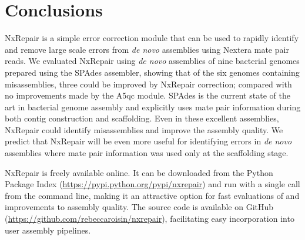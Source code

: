 \section{Conclusions}
NxRepair is a simple error correction module that can be used to rapidly identify and remove large scale errors from \textit{de novo} assemblies using Nextera mate pair reads. We evaluated NxRepair using \textit{de novo} assemblies of nine bacterial genomes prepared using the SPAdes assembler, showing that of the six genomes containing misassemblies, three could be improved by NxRepair correction; compared with no improvements made by the A5qc module. SPAdes is the current state of the art in bacterial genome assembly and explicitly uses mate pair information during both contig construction and scaffolding. Even in these excellent assemblies, NxRepair could identify misassemblies and improve the assembly quality. We predict that NxRepair will be even more useful for identifying errors in \textit{de novo} assemblies where mate pair information was used only at the scaffolding stage. 

NxRepair is freely available online. It can be downloaded from the Python Package Index (\url{https://pypi.python.org/pypi/nxrepair}) and run with a single call from the command line, making it an attractive option for fast evaluations of and improvements to assembly quality. The source code is available on GitHub (\url{https://github.com/rebeccaroisin/nxrepair}), facilitating easy incorporation into user assembly pipelines.  
